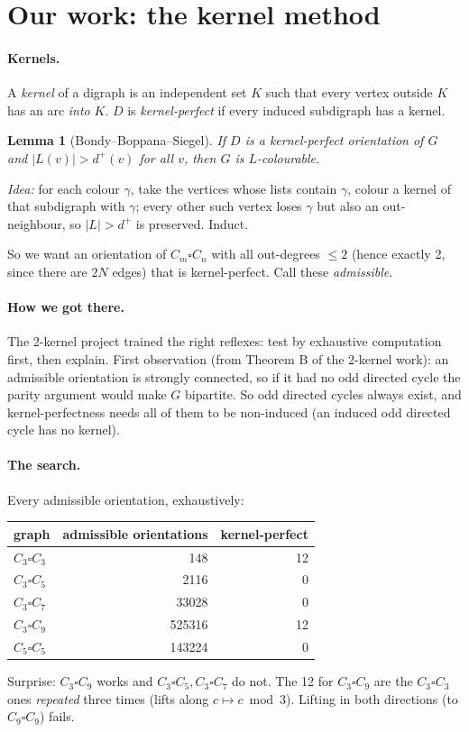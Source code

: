 \documentclass[11pt]{article}
\theoremstyle{plain}
\newtheorem{lemma}[theorem]{Lemma}
\theoremstyle{definition}
\newcommand{\T}{\square}
\begin{document}
\section{Our work: the kernel method}

\paragraph{Kernels.} A \emph{kernel} of a digraph is an independent set $K$ such that every
vertex outside $K$ has an arc \emph{into} $K$. $D$ is \emph{kernel-perfect} if every induced
subdigraph has a kernel.

\begin{lemma}[Bondy--Boppana--Siegel]
If $D$ is a kernel-perfect orientation of $G$ and $|L(v)|>d^+(v)$ for all $v$, then $G$ is
$L$-colourable.
\end{lemma}
\emph{Idea:} for each colour $\gamma$, take the vertices whose lists contain $\gamma$, colour
a kernel of that subdigraph with $\gamma$; every other such vertex loses $\gamma$ but also an
out-neighbour, so $|L|>d^+$ is preserved. Induct.

So we want an orientation of $C_m\T C_n$ with all out-degrees $\le2$ (hence exactly 2,
since there are $2N$ edges) that is kernel-perfect. Call these \emph{admissible}.

\paragraph{How we got there.} The 2-kernel project trained the right reflexes: test by
exhaustive computation first, then explain. First observation (from Theorem B of the 2-kernel
work): an admissible orientation is strongly connected, so if it had no odd directed
cycle the parity argument would make $G$ bipartite. So odd directed cycles always exist, and
kernel-perfectness needs all of them to be non-induced (an induced odd directed cycle has no
kernel).

\paragraph{The search.} Every admissible orientation, exhaustively:
\begin{center}
\begin{tabular}{@{}lrr@{}}
\toprule
graph & admissible orientations & kernel-perfect\\
\midrule
$C_3\T C_3$ & 148 & 12\\
$C_3\T C_5$ & 2116 & 0\\
$C_3\T C_7$ & 33028 & 0\\
$C_3\T C_9$ & 525316 & 12\\
$C_5\T C_5$ & 143224 & 0\\
\bottomrule
\end{tabular}
\end{center}
Surprise: $C_3\T C_9$ works and $C_3\T C_5,C_3\T C_7$ do not. The 12 for $C_3\T C_9$ are the
$C_3\T C_3$ ones \emph{repeated} three times (lifts along $c\mapsto c\bmod3$). Lifting in both
directions (to $C_9\T C_9$) fails.
\end{document}
